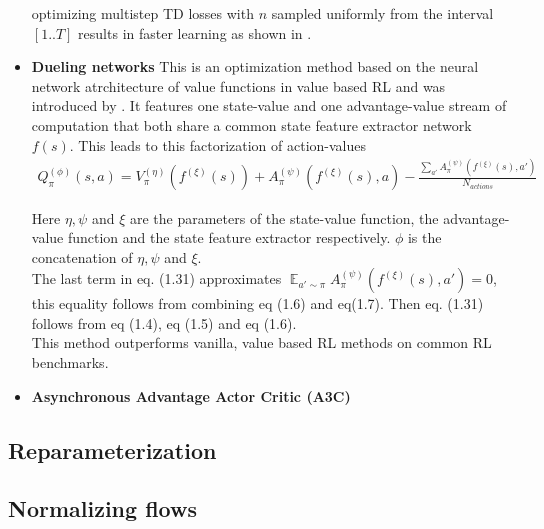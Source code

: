 \begin{itemize}
	optimizing multistep TD losses with $n$ sampled uniformly from the interval $[1..T]$ results in faster learning as shown in \cite{SBQL}.
	
	\item \textbf{Dueling networks} This is an optimization method based on the neural network atrchitecture of value functions in value based RL and was introduced by \cite{DBLP:journals/corr/WangFL15}. It features one state-value and one advantage-value stream of computation that both share a common state feature extractor network $f(s)$. This leads to this factorization of action-values
	\begin{align}
		Q_{\pi}^{(\phi)}(s, a) = V_{\pi}^{(\eta)}(f^{(\xi)}(s)) + A_{\pi}^{(\psi)}(f^{(\xi)}(s), a) - \frac{\sum_{a'} A_{\pi}^{(\psi)}(f^{(\xi)}(s), a')}{N_{actions}}
	\end{align}
	
	Here $\eta, \psi$ and $\xi$ are the parameters of the state-value function, the advantage-value function and the state feature extractor respectively. $\phi$ is the concatenation of $\eta, \psi$ and $\xi$.\\
	The last term in eq. (1.31) approximates $\mathop{\mathbb{E}}_{a' \sim \pi} A_{\pi}^{(\psi)}(f^{(\xi)}(s), a')=0$, this equality follows from combining eq (1.6) and eq(1.7). Then eq. (1.31) follows from eq (1.4), eq (1.5) and eq (1.6).\\
	This method outperforms vanilla, value based RL methods on common RL benchmarks. 
	
	\item \textbf{Asynchronous Advantage Actor Critic (A3C)} \label{ssec::a3c} \cite{mnih2016asynchronous}
	
\end{itemize}

\subsection{Reparameterization} \label{ssec:reparam}

\subsection{Normalizing flows}\label{ssec:norm_flows}
